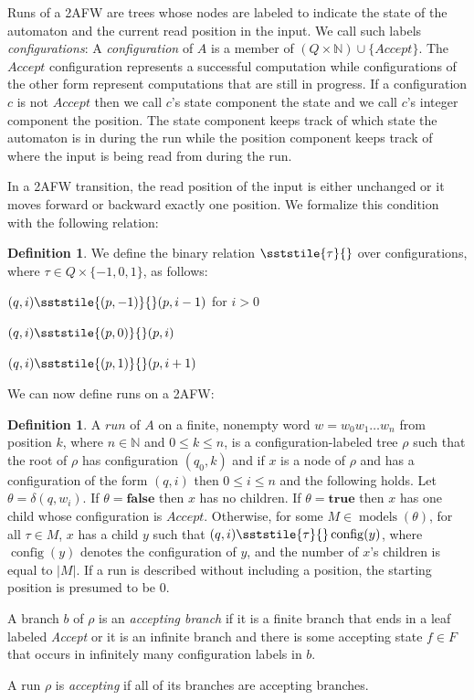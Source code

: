 \documentclass[10pt,a4paper]{amsart}
\theoremstyle{plain}
\theoremstyle{definition}
\newtheorem{definition}[thm]{Definition}
\theoremstyle{definition}
\newcommand{\sderives}[1]{\sststile{#1}{}}
\DeclareMathOperator{\config}{config}
\DeclareMathOperator{\?}{?}
\DeclareMathOperator{\mymodels}{models}
\begin{document}
Runs of a 2AFW are trees whose nodes are labeled to indicate the state of the automaton and
    the current read position in the input. We call such labels \textit{configurations}: A \textit{configuration} of $A$ is a member of $(Q \times \mathbb{N}) \cup \{Accept\}$. The $Accept$
configuration represents a successful computation while configurations of the other form represent
computations that are still in progress.  If a
configuration $c$ is not $Accept$ then we call $c$'s state component the state and
we call $c$'s integer component the position. The state component keeps track of which state the automaton
is in during the run while the position component keeps track of where the input is being read from during the run.

In a 2AFW transition, the read position of the input is either unchanged or it moves forward or
backward exactly one position. We formalize this condition with the following relation:

    \begin{definition}\label{def:sderives}
We define the binary relation $\sderives{\tau}$ over configurations, where $\tau \in Q \times
\{-1,0,1\}$, as follows:

$(q,i) \sderives{(p,-1)} (p,i-1)$ for $i > 0$

$(q,i) \sderives{(p,0)} (p,i)$

$(q,i) \sderives{(p,1)} (p, i+1)$

    \end{definition}

    We can now define runs on a 2AFW:

\begin{definition}\label{def:run}
A $run$ of $A$ on a finite, nonempty word $w = w_0w_1 \ldots w_n$ from position $k$, where $n \in \mathbb{N}$ and $0 \leq k \leq n$, is a configuration-labeled tree $\rho$ such that the root of $\rho$ has configuration $(q_0, k)$ and if $x$ is a node of $\rho$ and has a configuration of the form $(q,i)$ then $0 \leq i \leq n$ and the following holds. Let $\theta = \delta(q,w_i)$. If $\theta = \textbf{false}$ then $x$ has no children.  If $\theta = \textbf{true}$ then $x$ has one child whose configuration is $\textit{Accept}$. Otherwise, for some $M \in \mymodels(\theta)$, for all $\tau \in M$, $x$ has a child $y$ such that $(q,i) \sderives{\tau} \config (y)$, where $\config (y)$ denotes the configuration of $y$, and the number of $x$'s children is equal to $|M|$. If a run is described without including a position, the starting position is presumed to be 0.

A branch $b$ of $\rho$ is an \textit{accepting branch} if it is a finite branch that ends in a leaf labeled \textit{Accept} or it is an infinite branch and there is some accepting state $f \in F$ that occurs in infinitely many configuration labels in $b$.

A run $\rho$ is \textit{accepting} if all of its branches are accepting branches.
\end{definition}
\end{document}
